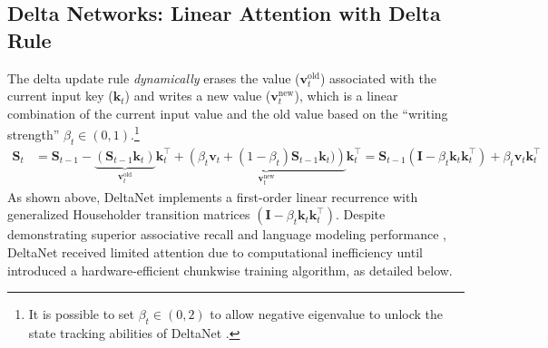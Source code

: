 \documentclass{article}
\def\rmI{{\mathbf{I}}}
\def\rmS{{\mathbf{S}}}
\def\vk{{\bm{k}}}
\def\vv{{\bm{v}}}
\begin{document}
\subsection{Delta Networks: Linear Attention with Delta Rule}
The delta update rule \citep{widrow_adaptive_1988, schlag_linear_2021} \emph{dynamically} erases the value ($\vv_t^{\text{old}}$) associated with the current input key ($\vk_t$) and writes a new value ($\vv_t^{\text{new}}$), which is a linear combination of the current input value and the old value
based on the ``writing strength'' $\beta_t \in (0,1)$.\footnote{It is possible to set $\beta_t \in (0, 2)$ to allow negative eigenvalue to unlock the state tracking abilities of DeltaNet \citep{Grazzi2024UnlockingSI,siems2025deltaproductincreasingexpressivitydeltanet}.}
\begin{align*}
    \rmS_t &= \rmS_{t-1} - \underbrace{\left(\rmS_{t-1} \vk_t\right)}_{\vv_{t}^{\text{old}}}  \vk_t^\intercal + \underbrace{\left(\beta_t \vv_t + (1-\beta_t)\rmS_{t-1}\vk_t)\right)}_{\vv_{t}^{\text{new}}}  \vk_t^\intercal 
= \rmS_{t-1} \left(\rmI - \beta_t \vk_t \vk_t^\intercal \right)  + \beta_t  \vv_t \vk_t^\intercal 
\end{align*}
As shown above, DeltaNet implements a first-order linear recurrence with generalized Householder transition matrices $\left(\rmI - \beta_t \vk_t \vk_t^\intercal \right)$. Despite demonstrating superior associative recall and language modeling performance \citep{linear-xmr-fastweight}, DeltaNet received limited attention due to computational inefficiency until \citet{yang2024parallelizing} introduced a hardware-efficient chunkwise training algorithm, as detailed below.
\vspace{-2mm}
\end{document}
